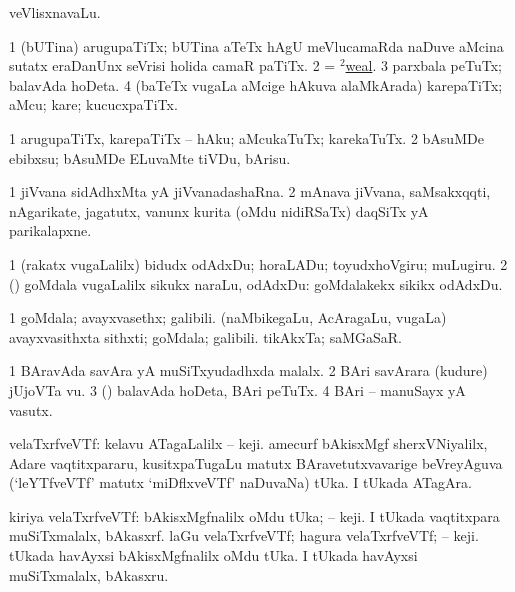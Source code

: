 \bentry
{} 
\gl{\nA}
\bmng
veVlisxnavaLu. 
\emng
\eentry

\bentry
{} 
\gl{\nA}
\expl{}
\bmng
\bnum
\num{1} (bUTina) arugupaTiTx; bUTina aTeTx hAgU meVlucamaRda naDuve aMcina sutatx eraDanUnx seVrisi holida camaR paTiTx. 
\num{2} = \hyperlink{weal(2)}{$^2$weal}. 
\num{3} parxbala peTuTx; balavAda hoDeta. 
\num{4} (baTeTx \mo vugaLa aMcige hAkuva alaMkArada) karepaTiTx; aMcu; kare; kucucxpaTiTx. 
\enum
\emng
\eentry

\bentry
{} 
\gl{\sakirx}
\expl{}
\bmng
\bnum
\num{1} arugupaTiTx, karepaTiTx -- hAku; aMcukaTuTx; karekaTuTx. 
\num{2} bAsuMDe ebibxsu; bAsuMDe ELuvaMte tiVDu, bArisu. 
\enum
\emng
\eentry

\bentry 
{} 
\gl{\nA}
\expl{\G}
\bmng
\bnum
\num{1} jiVvana sidAdhxMta yA jiVvanadashaRna. 
\num{2} mAnava jiVvana, saMsakxqqti, nAgarikate, jagatutx, \mo vanunx kurita (oMdu nidiRSaTx) daqSiTx yA parikalapxne. 
\enum
\emng
\eentry

\bentry
{} 
\gl{\akirx}
\expl{}
\bmng
\bnum
\num{1} (rakatx \mo vugaLalilx) bidudx odAdxDu; horaLADu; toyudxhoVgiru; muLugiru. 
\num{2} (\rUpa) goMdala \mo vugaLalilx sikukx naraLu, odAdxDu:  goMdalakekx sikikx odAdxDu. 
\enum
\emng
\eentry

\bentry
{} 
\gl{\nA}
\expl{}
\bmng
\bnum
\num{1} goMdala; avayxvasethx; galibili. 
 (naMbikegaLu, AcAragaLu, \mo vugaLa) 
\banum
{} avayxvasithxta sithxti; goMdala; galibili. 
 tikAkxTa; saMGaSaR. 
\eanum
\numie
\enum
\emng
\eentry

\bentry
{} 
\gl{\nA}
\expl{}
\bmng
\bnum
\num{1} BAravAda savAra yA muSiTxyudadhxda malalx. 
\num{2} BAri savArara (kudure) jUjoVTa \mo vu. 
\num{3} (\AmA) balavAda hoDeta, BAri peTuTx. 
\num{4} BAri -- manuSayx yA vasutx. 
\enum
\emng
\eentry

\bentry 
{} 
\gl{\nA}
\expl{}
\bmng
velaTxrfveVTf: 
\banum
{} kelavu ATagaLalilx  -- keji. amecurf bAkisxMgf sherxVNiyalilx, Adare vaqtitxpararu, kusitxpaTugaLu matutx BAravetutxvavarige beVreyAguva (`leYTfveVTf' matutx `miDflxveVTf' naDuvaNa) tUka. 
 I tUkada ATagAra. 
\eanum
\emng

\noindent 
\gl{\pagu}
\expl{}
\bmng
\bnum
{}  kiriya velaTxrfveVTf: 
\banum
{} bAkisxMgfnalilx oMdu tUka;  --  keji. 
 I tUkada vaqtitxpara muSiTxmalalx, bAkasxrf. 
\eanum
\numie
{}  
\banum
{} laGu velaTxrfveVTf; hagura velaTxrfveVTf;  --  keji. tUkada havAyxsi bAkisxMgfnalilx oMdu tUka. 
 I tUkada havAyxsi muSiTxmalalx, bAkasxru. 
\eanum
\numie
\enum
\emng
\eentry

